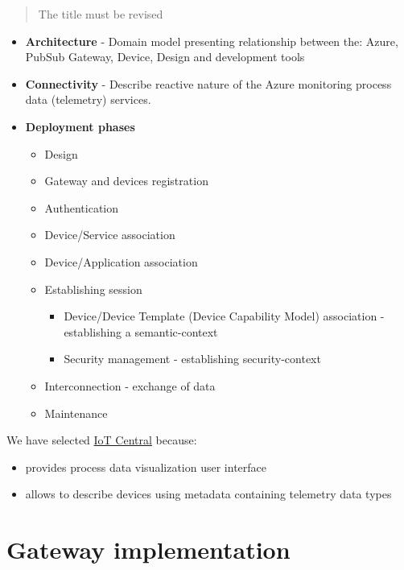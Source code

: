 \documentclass[
]{article}
\providecommand{\tightlist}{%
  \setlength{\itemsep}{0pt}\setlength{\parskip}{0pt}}
\begin{document}
\begin{quote}
The title must be revised
\end{quote}

\begin{itemize}
\tightlist
\item
  \textbf{Architecture} - Domain model presenting relationship between
  the: Azure, PubSub Gateway, Device, Design and development tools
\item
  \textbf{Connectivity} - Describe reactive nature of the Azure
  monitoring process data (telemetry) services.
\item
  \textbf{Deployment phases}

  \begin{itemize}
  \tightlist
  \item
    Design
  \item
    Gateway and devices registration
  \item
    Authentication
  \item
    Device/Service association
  \item
    Device/Application association
  \item
    Establishing session

    \begin{itemize}
    \tightlist
    \item
      Device/Device Template (Device Capability Model) association -
      establishing a semantic-context
    \item
      Security management - establishing security-context
    \end{itemize}
  \item
    Interconnection - exchange of data
  \item
    Maintenance
  \end{itemize}
\end{itemize}

We have selected
\href{https://docs.microsoft.com/azure/iot-central/core/}{IoT Central}
because:

\begin{itemize}
\tightlist
\item
  provides process data visualization user interface
\item
  allows to describe devices using metadata containing telemetry data
  types
\end{itemize}

\hypertarget{gateway-implementation}{%
\section{Gateway implementation}\label{gateway-implementation}}
\end{document}

